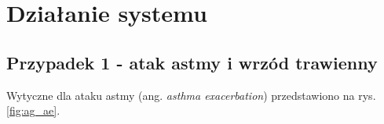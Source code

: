 \chapter{Działanie systemu}



\section{Przypadek 1 - atak astmy i wrzód trawienny}

Wytyczne dla ataku astmy (ang. \textit{asthma exacerbation}) przedstawiono na rys. \ref{fig:ag_ae}.


